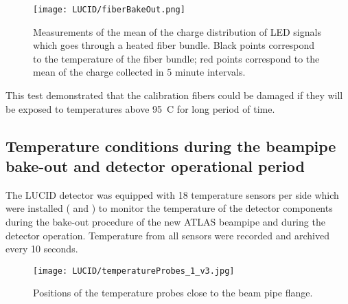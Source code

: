 \begin{figure}
\centering
\texttt{[image: LUCID/fiberBakeOut.png]}
\caption{Measurements of the mean of the charge distribution of LED signals which goes through a heated fiber bundle.
Black points correspond to the temperature of the fiber bundle; red points correspond to the mean of the charge collected in 5 minute intervals.}
\label{fig:fiberBakeOut}
\end{figure}

This test demonstrated that the calibration fibers could be damaged if they will be exposed 
to temperatures above 95\degree~C for long period of time.
% 
% 
 
\subsection{Temperature conditions during the beampipe bake-out and detector operational period}

The LUCID detector was equipped with 18 temperature sensors per side which were installed (
and )
to monitor the temperature of the detector components during the bake-out procedure of the new ATLAS beampipe and during the detector operation.
Temperature from all sensors were recorded and archived every 10 seconds.

\begin{figure}
\centering
\texttt{[image: LUCID/temperatureProbes\_1\_v3.jpg]}
\caption{Positions of the temperature probes close to the beam pipe flange.}
\label{fig:TempProbes1}
\end{figure}

